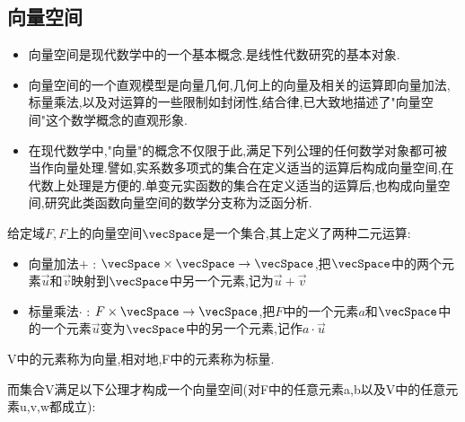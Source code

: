 {{      \subsection{向量空间}{
          \begin{itemize}
              \item 向量空间是现代数学中的一个基本概念.是线性代数研究的基本对象.
              \item 向量空间的一个直观模型是向量几何,几何上的向量及相关的运算即向量加法,标量乘法,以及对运算的一些限制如封闭性,结合律,已大致地描述了"向量空间"这个数学概念的直观形象.
              \item 在现代数学中,"向量"的概念不仅限于此,满足下列公理的任何数学对象都可被当作向量处理.譬如,实系数多项式的集合在定义适当的运算后构成向量空间,在代数上处理是方便的.单变元实函数的集合在定义适当的运算后,也构成向量空间,研究此类函数向量空间的数学分支称为泛函分析.
          \end{itemize}

          给定域$F,F$上的向量空间$\vecSpace$是一个集合,其上定义了两种二元运算:

          \begin{itemize}
              \item 向量加法$+$ : $\vecSpace \times \vecSpace \to \vecSpace$,把$\vecSpace$中的两个元素$\vec{u}$和$\vec{v}$映射到$\vecSpace$中另一个元素,记为$\vec{u} + \vec{v}$
              \item 标量乘法$\cdot$ : $F \times \vecSpace \to \vecSpace$,把$F$中的一个元素$a$和$\vecSpace$中的一个元素$\vec{u}$变为$\vecSpace$中的另一个元素,记作$a \cdot \vec{u}$
          \end{itemize}

          V中的元素称为向量,相对地,F中的元素称为标量.

          而集合V满足以下公理才构成一个向量空间(对F中的任意元素a,b以及V中的任意元素u,v,w都成立):

}}}
